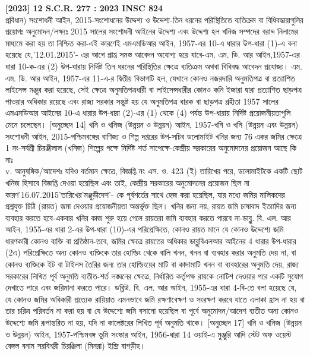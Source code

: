 \documentclass[12pt,a4paper]{article}
\newcommand{\bn}[1]{{\bengalifont #1}}
\newcommand{\bn}[1]{{\bengalifont #1}}
\begin{document}
\begin{center}
{\large\textbf{[2023] 12 S.C.R. 277 : 2023 INSC 824}}\\[4pt]
\bn{278 প্রবিধান) সংশোধনী আইন, 2015-সংশোধনের উদ্দেশ্য ও উদ্দেশ্য-তিন ধরনের পরিস্থিতিতে ব্যতিক্রম বা বিধিবদ্ধারাগুলির প্রয়োগঃ অনুমোদন/লক্ষ্যঃ 2015 সালের সংশোধনী আইনের উদ্দেশ্য এবং উদ্দেশ্য হল খনিজ সম্পদের বরাদ্দ নিলামের মাধ্যমে করা হয় তা নিশ্চিত করা-এই কারণেই এমএমডিআর আইন, 1957-এর 10-এ ধারার উপ-ধারা (1)-এ বলা হয়েছে যে,'12.01.2015'- এর আগে প্রাপ্ত সমস্ত আবেদন অযোগ্য হয়ে যাবে-এম. এম. ডি. আর আইন,1957-এর ধারা 10-ক-এর (2) উপ-ধারায় নির্দিষ্ট তিন ধরনের পরিস্থিতির ক্ষেত্রে ব্যতিক্রম অথবা বিধিবদ্ধ আবেদন প্রযোজ্য। এম. এম. ডি. আর আইন, 1957-এর 11-এ-র দ্বিতীয় বিভাগটি হল, যেখানে কোনও নজরদারি অনুমতিপত্র বা প্রত্যাশিত লাইসেন্স মঞ্জুর করা হয়েছে, সেই ক্ষেত্রে অনুমতিপত্রধারী বা লাইসেন্সধারীর কোনও কনি ইজারা দ্বারা প্রত্যাশিত ছাড়পত্র পাওয়ার অধিকার রয়েছে এবং রাজ্য সরকার সন্তুষ্ট হয় যে অনুমতিপত্র ধারক বা ছাড়পত্র গ্রহীতা 1957 সালের এমএমডিআর আইনের 10-এ ধারার উপ-ধারা (2)-এর (1) থেকে (4) পর্যন্ত উপ-ধারায় নির্দিষ্ট প্রয়োজনীয়তাগুলি মেনে চলেছেন। [অনুচ্ছেদ 14] খনি ও খনিজ (উন্নয়ন ও উন্নয়ন) আইন, 1957-খনি ও খনি (উন্নয়ন এবং উন্নয়ন) সংশোধনী আইন, 2015-পশ্চিমবঙ্গের বাণিজ্য ও শিল্প দপ্তরের উপ-সচিব ডলোমাইট খনির জন্য 76 একর জমির ক্ষেত্রে 1 নং-সর্বশ্রী চিরঞ্জীলাল (খনিজ) শিল্পের পক্ষে নির্দিষ্ট শর্ত সাপেক্ষে-কেন্দ্রীয় সরকারের অনুমোদনের প্রয়োজন আছে কি নাঃ\\[4pt]
v.
\bn{279 আনুষঙ্গিক/আদেশঃ যদিও বর্তমান ক্ষেত্রে, বিজ্ঞপ্তি নং এস. ও. 423 (ই) তারিখের পরে, ডলোমাইটকে একটি ছোট খনিজ হিসাবে বিজ্ঞপ্তি দেওয়া হয়েছিল এবং তাই, কেন্দ্রীয় সরকারের অনুমোদনের প্রয়োজন ছিল না কারণ'16.07.2015'তারিখের'মঞ্জুড়ীদেশ'- কে পূর্বশর্তের সাথে হেজ করা হয়েছিল, যার মধ্যে জমির মালিকদের প্রশ্নযুক্ত চিঠি (রায়ত) জমা দেওয়ার প্রয়োজনীয়তা অন্তর্ভুক্ত ছিল। খনির জন্য নয়, রায়ত জমি চাষাবাদ ইত্যাদির জন্য ব্যবহার করতে হবে-একবার খনির কাজ শুরু হয়ে গেলে রায়তরা জমি ব্যবহার করতে পারবে না-ডাব্লু. বি. এল. আর আইন, 1955-এর ধারা 2-এর উপ-ধারা (10)-এর পরিপ্রেক্ষিতে, কোনও রায়ত মানে যে কোনও উদ্দেশ্যে জমি ধারণকারী কোনও ব্যক্তি বা প্রতিষ্ঠান-তবে, জমির ক্ষেত্রে রায়তের অধিকার ডাব্লুবিএলআর আইনের 4 ধারার উপ-ধারার (2এ) পরিপ্রেক্ষিতে অন্য কোনও ব্যক্তিকে তার হোল্ডিং থেকে বালি খনন, খনন বা ব্যবহার করার অনুমতি দেয় না, বা কোনও ব্যক্তিকে ইট বা টাইলস তৈরির জন্য তার হোল্ডিংয়ের মাটি বা কাদামাটি খনন বা ব্যবহারের অনুমতি দেয়, রাজ্য সরকারের লিখিত পূর্ব অনুমতি ব্যতীত-শর্ত লঙ্ঘনের ক্ষেত্রে, নির্ধারিত কর্তৃপক্ষ রায়কে নোটিশ দেওয়ার পরে একটি সুযোগ দেখাতে পারে এবং জরিমানা করতে পারে। ডব্লিউ. বি. এল. আর আইন, 1955-এর ধারা 4-বি-তে বলা হয়েছে যে, যে কোনও জমির অধিকারী প্রত্যেক রায়িয়াত এমনভাবে জমি রক্ষণাবেক্ষণ ও সংরক্ষণ করবে যাতে এলাকা হ্রাস না হয় বা তার চরিত্র পরিবর্তন না করা হয় বা যে উদ্দেশ্যে জমি বসানো হয়েছিল বা পূর্বে অনুমোদন/আদেশ ব্যতীত অন্য কোনও উদ্দেশ্যে জমি রূপান্তরিত না হয়, যদি না কালেক্টরের লিখিত পূর্ব অনুমতি থাকে। [অনুচ্ছেদ 17] খনি ও খনিজ (উন্নয়ন ও উন্নয়ন) আইন, 1957-পশ্চিমবঙ্গ ভূমি সংস্কার আইন, 1956-ধারা 14 ওয়াই-এ মুঞ্জুরি আদি স্টেট অফ ওয়েস্ট বেঙ্গল বনাম সরবিশ্বরী চিরঞ্জিলা (মিনরা) ইন্দ্রি বাগড়ীহ।\\[4pt]
}}
\end{center}
\end{document}
